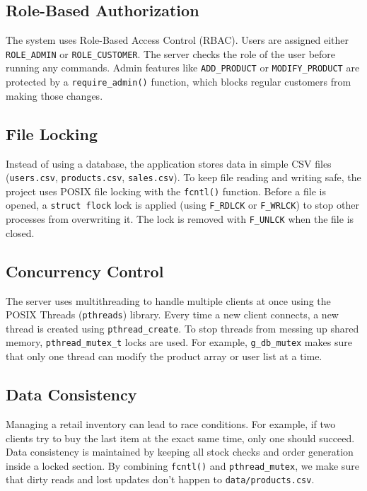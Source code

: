 \documentclass[12pt,a4paper]{article}
\begin{document}
\subsection{Role-Based Authorization}
The system uses Role-Based Access Control (RBAC). Users are assigned either \texttt{ROLE\_ADMIN} or \texttt{ROLE\_CUSTOMER}. 
The server checks the role of the user before running any commands. Admin features like \texttt{ADD\_PRODUCT} or \texttt{MODIFY\_PRODUCT} are protected by a \texttt{require\_admin()} function, which blocks regular customers from making those changes.

\subsection{File Locking}
Instead of using a database, the application stores data in simple CSV files (\texttt{users.csv}, \texttt{products.csv}, \texttt{sales.csv}). 
To keep file reading and writing safe, the project uses POSIX file locking with the \texttt{fcntl()} function. 
Before a file is opened, a \texttt{struct flock} lock is applied (using \texttt{F\_RDLCK} or \texttt{F\_WRLCK}) to stop other processes from overwriting it. The lock is removed with \texttt{F\_UNLCK} when the file is closed.

\subsection{Concurrency Control}
The server uses multithreading to handle multiple clients at once using the POSIX Threads (\texttt{pthreads}) library. Every time a new client connects, a new thread is created using \texttt{pthread\_create}. 
To stop threads from messing up shared memory, \texttt{pthread\_mutex\_t} locks are used. For example, \texttt{g\_db\_mutex} makes sure that only one thread can modify the product array or user list at a time.

\subsection{Data Consistency}
Managing a retail inventory can lead to race conditions. For example, if two clients try to buy the last item at the exact same time, only one should succeed. 
Data consistency is maintained by keeping all stock checks and order generation inside a locked section. By combining \texttt{fcntl()} and \texttt{pthread\_mutex}, we make sure that dirty reads and lost updates don't happen to \texttt{data/products.csv}.
\end{document}
